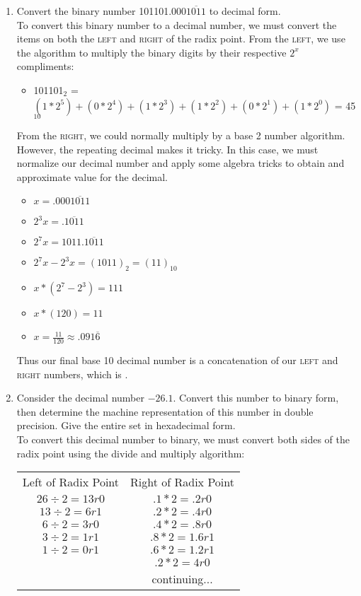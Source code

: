 \documentclass[12pt]{article}
\begin{document}
\begin{enumerate}
	\item Convert the binary number 101101.000$\overline{1011}$ to decimal form. \\
	
	To convert this binary number to a decimal number, we must convert the items on both the \textsc{left} and \textsc{right} of the radix point. From the \textsc{left}, we use the algorithm to multiply the binary digits by their respective \(2^x\) compliments: 
	
	\begin{itemize}
		\item[] 101101$_2$ = $(1*2^5) + (0*2^4) + (1*2^3) + (1*2^2) + (0*2^1) + (1*2^0)$ = 45$_{10}$
	\end{itemize}
	
From the \textsc{right}, we could normally multiply by a base 2 number algorithm. However, the repeating decimal makes it tricky. In this case, we must normalize our decimal number and apply some algebra tricks to obtain and approximate value for the decimal.

	\begin{itemize}
		\item[] $x = .000\overline{1011}$
		\item[] $2^3x = .\overline{1011}$
		\item[] $2^7x = 1011.\overline{1011}$
		\item[] $2^7x - 2^3x = (1011)_2 = (11)_{10}$
		\item[] $x*(2^7 - 2^3) = 111$
		\item[] $x*(120)= 11$
		\item[] $x = \frac{11}{120} \approx .091\overline{6}$
	\end{itemize}
	
Thus our final base 10 decimal number is a concatenation of our \textsc{left} and \textsc{right} numbers, which is .\\

	\item Consider the decimal number $-26.1$. Convert this number to binary form, then determine the machine representation of this number in double precision. Give the entire set in hexadecimal form. \\
	
	To convert this decimal number to binary, we must convert both sides of the radix point using the divide and multiply algorithm:
	
	\begin{center}
	\begin{tabular}{ c c }
	Left of Radix Point   & Right of Radix Point  \\
	$26\div2 = 13r0$ & $.1 * 2 = .2 r0$  \\ 
 	$13\div2 = 6r1$  & $.2 * 2 = .4 r0$  \\  
 	$6\div2 = 3r0$   & $.4 * 2 = .8 r0$  \\
 	$3\div2 = 1r1$   & $.8 * 2 = 1.6 r1$ \\
 	$1\div2 = 0r1$   & $.6 * 2 = 1.2 r1$ \\
 					 & $.2 * 2 = 4 r0$ \\
 	 				 & continuing... \\
 					 

\end{tabular}
\end{center}
\end{enumerate}
\end{document}
